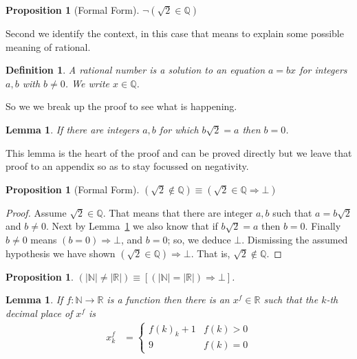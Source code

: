 \documentclass{amsart}
\newtheorem{lemma}[thm]{Lemma}
\newtheorem{prop}[thm]{Proposition}
\newtheorem{defn}[thm]{Definition}
\begin{document}
\begin{prop}[Formal Form]
    $\neg(\sqrt{2}\in \mathbb{Q})$
\end{prop}

Second we identify the context, in this case that means to explain 
some possible meaning of rational.

\begin{defn}
    A \emph{rational number} is a solution to an equation 
    $a=bx$ for integers $a,b$ with $b\neq 0$.
    We write $x\in \mathbb{Q}$.
\end{defn}

So we we break up the proof to see what is happening.
\begin{lemma}\label{lem:irrational}
    If there are integers $a,b$ for which $b\sqrt{2}=a$ then 
    $b=0$.
\end{lemma}
This lemma is the heart of the proof and can be proved directly
but we leave that proof to an appendix so as to stay focussed 
on negativity.

\begin{prop}[Formal Form]
    $(\sqrt{2}\notin \mathbb{Q})\equiv (\sqrt{2}\in \mathbb{Q}\Rightarrow \bot)$
\end{prop}
\begin{proof}
    Assume $\sqrt{2}\in \mathbb{Q}$.  That means that there are 
    integer $a,b$ such that $a=b\sqrt{2}$ and $b\neq 0$.
    Next by Lemma~\ref{lem:irrational} we also know 
    that if $b\sqrt{2}=a$ then $b=0$. 
    Finally $b\neq 0$ means $(b=0)\Rightarrow \bot$, 
    and $b=0$; so, we deduce $\bot$.
    Dismissing the assumed hypothesis we have shown 
    $(\sqrt{2}\in \mathbb{Q})\Rightarrow \bot$.
    That is, $\sqrt{2}\notin \mathbb{Q}$.
\end{proof}

\begin{prop}
    $(|\mathbb{N}|\neq |\mathbb{R}|)\equiv [(|\mathbb{N}|=|\mathbb{R}|)\Rightarrow \bot]$. 
\end{prop}

\begin{lemma}\label{lem:diagonal}
    If $f:\mathbb{N}\to \mathbb{R}$ is a function then there is 
    an $x^f\in \mathbb{R}$ such that the $k$-th decimal place of 
    $x^f$ is
    \begin{align*}
        x^f_k & = \left\{\begin{array}{cc}
            f(k)_k+1 & f(k)>0\\
            9 & f(k)=0
        \end{array}
        \right.
    \end{align*}
\end{lemma}
\end{document}
